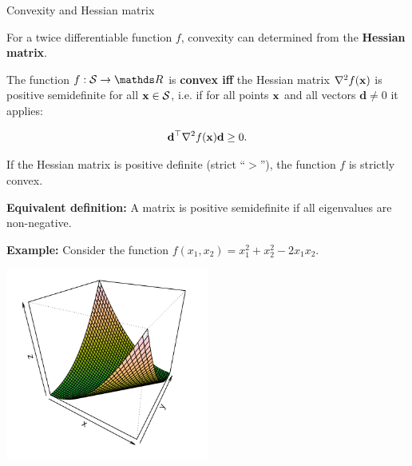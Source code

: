 \begin{vbframe}{Convexity and Hessian matrix}

For a twice differentiable function $f$, convexity can determined from the \textbf{Hessian matrix}.

\lz

The function $f: \mathcal{S} \to \R$ is \textbf{convex iff} the Hessian matrix $\nabla^2f(\mathbf{x})$ is positive semidefinite for all $\mathbf{x} \in \mathcal{S}$, i.e. if for all points $\mathbf{x}$ and all vectors $\mathbf{d} \ne 0$ it applies:

$$
\mathbf{d}^{\top} \nabla^2f(\mathbf{x})\mathbf{d} \ge 0.
$$

If the Hessian matrix is positive definite (strict \enquote{$>$}), the function $f$ is strictly convex.

\lz

\textbf{Equivalent definition:} A matrix is positive semidefinite if all eigenvalues are non-negative.


\framebreak



\textbf{Example:} Consider the function $f(x_1, x_2) = x_1^2 + x_2^2 - 2x_1x_2$.

\begin{center}
  \includegraphics[width = 0.5\textwidth]{figure_man/convex-example.png}
\end{center}


\end{vbframe}
